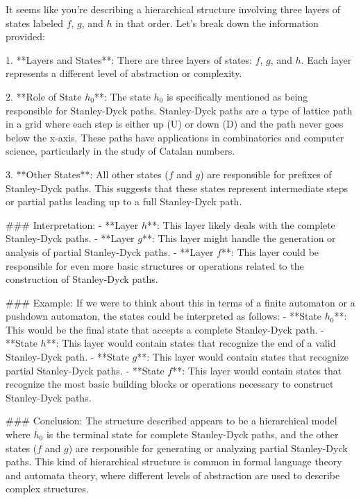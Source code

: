 It seems like you're describing a hierarchical structure involving three layers of states labeled \( f \), \( g \), and \( h \) in that order. Let's break down the information provided:

1. **Layers and States**: There are three layers of states: \( f \), \( g \), and \( h \). Each layer represents a different level of abstraction or complexity.

2. **Role of State \( h_0 \)**: The state \( h_0 \) is specifically mentioned as being responsible for Stanley-Dyck paths. Stanley-Dyck paths are a type of lattice path in a grid where each step is either up (U) or down (D) and the path never goes below the x-axis. These paths have applications in combinatorics and computer science, particularly in the study of Catalan numbers.

3. **Other States**: All other states (\( f \) and \( g \)) are responsible for prefixes of Stanley-Dyck paths. This suggests that these states represent intermediate steps or partial paths leading up to a full Stanley-Dyck path.

### Interpretation:
- **Layer \( h \)**: This layer likely deals with the complete Stanley-Dyck paths.
- **Layer \( g \)**: This layer might handle the generation or analysis of partial Stanley-Dyck paths.
- **Layer \( f \)**: This layer could be responsible for even more basic structures or operations related to the construction of Stanley-Dyck paths.

### Example:
If we were to think about this in terms of a finite automaton or a pushdown automaton, the states could be interpreted as follows:
- **State \( h_0 \)**: This would be the final state that accepts a complete Stanley-Dyck path.
- **State \( h \)**: This layer would contain states that recognize the end of a valid Stanley-Dyck path.
- **State \( g \)**: This layer would contain states that recognize partial Stanley-Dyck paths.
- **State \( f \)**: This layer would contain states that recognize the most basic building blocks or operations necessary to construct Stanley-Dyck paths.

### Conclusion:
The structure described appears to be a hierarchical model where \( h_0 \) is the terminal state for complete Stanley-Dyck paths, and the other states (\( f \) and \( g \)) are responsible for generating or analyzing partial Stanley-Dyck paths. This kind of hierarchical structure is common in formal language theory and automata theory, where different levels of abstraction are used to describe complex structures.